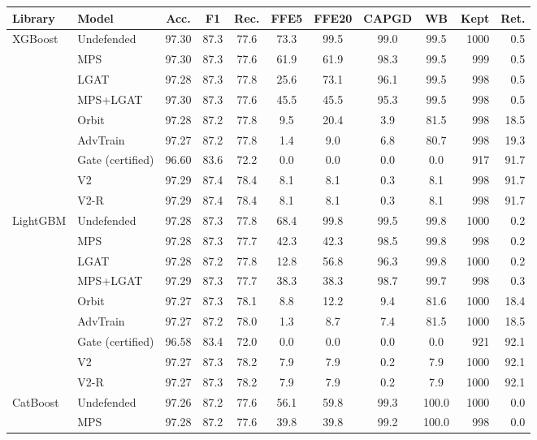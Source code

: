 \begin{tabular}{@{}llcccccccrr@{}}
\toprule
\textbf{Library} & \textbf{Model} & \textbf{Acc.} & \textbf{F1} & \textbf{Rec.} & \textbf{FFE5} & \textbf{FFE20} & \textbf{CAPGD} & \textbf{WB} & \textbf{Kept} & \textbf{Ret.} \\
\midrule
XGBoost & Undefended & 97.30 & 87.3 & 77.6 & 73.3 & 99.5 & 99.0 & 99.5 & 1000 & 0.5 \\
 & MPS & 97.30 & 87.3 & 77.6 & 61.9 & 61.9 & 98.3 & 99.5 & 999 & 0.5 \\
 & LGAT & 97.28 & 87.3 & 77.8 & 25.6 & 73.1 & 96.1 & 99.5 & 998 & 0.5 \\
 & MPS+LGAT & 97.30 & 87.3 & 77.6 & 45.5 & 45.5 & 95.3 & 99.5 & 998 & 0.5 \\
 & Orbit & 97.28 & 87.2 & 77.8 & 9.5 & 20.4 & 3.9 & 81.5 & 998 & 18.5 \\
 & AdvTrain & 97.27 & 87.2 & 77.8 & 1.4 & 9.0 & 6.8 & 80.7 & 998 & 19.3 \\
 & Gate (certified) & 96.60 & 83.6 & 72.2 & 0.0 & 0.0 & 0.0 & 0.0 & 917 & 91.7 \\
 & V2 & 97.29 & 87.4 & 78.4 & 8.1 & 8.1 & 0.3 & 8.1 & 998 & 91.7 \\
 & V2-R & 97.29 & 87.4 & 78.4 & 8.1 & 8.1 & 0.3 & 8.1 & 998 & 91.7 \\
\midrule
LightGBM & Undefended & 97.28 & 87.3 & 77.8 & 68.4 & 99.8 & 99.5 & 99.8 & 1000 & 0.2 \\
 & MPS & 97.28 & 87.3 & 77.7 & 42.3 & 42.3 & 98.5 & 99.8 & 998 & 0.2 \\
 & LGAT & 97.28 & 87.2 & 77.8 & 12.8 & 56.8 & 96.3 & 99.8 & 1000 & 0.2 \\
 & MPS+LGAT & 97.29 & 87.3 & 77.7 & 38.3 & 38.3 & 98.7 & 99.7 & 998 & 0.3 \\
 & Orbit & 97.27 & 87.3 & 78.1 & 8.8 & 12.2 & 9.4 & 81.6 & 1000 & 18.4 \\
 & AdvTrain & 97.27 & 87.2 & 78.0 & 1.3 & 8.7 & 7.4 & 81.5 & 1000 & 18.5 \\
 & Gate (certified) & 96.58 & 83.4 & 72.0 & 0.0 & 0.0 & 0.0 & 0.0 & 921 & 92.1 \\
 & V2 & 97.27 & 87.3 & 78.2 & 7.9 & 7.9 & 0.2 & 7.9 & 1000 & 92.1 \\
 & V2-R & 97.27 & 87.3 & 78.2 & 7.9 & 7.9 & 0.2 & 7.9 & 1000 & 92.1 \\
\midrule
CatBoost & Undefended & 97.26 & 87.2 & 77.6 & 56.1 & 59.8 & 99.3 & 100.0 & 1000 & 0.0 \\
 & MPS & 97.28 & 87.2 & 77.6 & 39.8 & 39.8 & 99.2 & 100.0 & 998 & 0.0 \\

\end{tabular}
